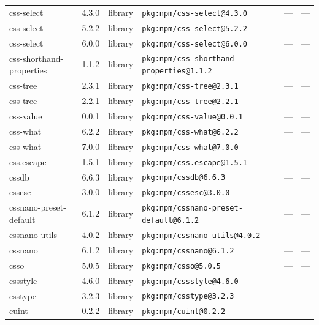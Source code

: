 \documentclass[11pt,a4paper]{article}
\begin{document}
\begin{longtable}{|p{4cm}|p{2cm}|p{1.6cm}|p{5cm}|p{1.5cm}|p{3.5cm}|}
\raggedright css-select & 4.3.0 & library & \small\texttt{pkg:npm/css-select@4.3.0} & — & \small — \\
\raggedright css-select & 5.2.2 & library & \small\texttt{pkg:npm/css-select@5.2.2} & — & \small — \\
\raggedright css-select & 6.0.0 & library & \small\texttt{pkg:npm/css-select@6.0.0} & — & \small — \\
\raggedright css-shorthand-properties & 1.1.2 & library & \small\texttt{pkg:npm/css-shorthand-properties@1.1.2} & — & \small — \\
\raggedright css-tree & 2.3.1 & library & \small\texttt{pkg:npm/css-tree@2.3.1} & — & \small — \\
\raggedright css-tree & 2.2.1 & library & \small\texttt{pkg:npm/css-tree@2.2.1} & — & \small — \\
\raggedright css-value & 0.0.1 & library & \small\texttt{pkg:npm/css-value@0.0.1} & — & \small — \\
\raggedright css-what & 6.2.2 & library & \small\texttt{pkg:npm/css-what@6.2.2} & — & \small — \\
\raggedright css-what & 7.0.0 & library & \small\texttt{pkg:npm/css-what@7.0.0} & — & \small — \\
\raggedright css.escape & 1.5.1 & library & \small\texttt{pkg:npm/css.escape@1.5.1} & — & \small — \\
\raggedright cssdb & 6.6.3 & library & \small\texttt{pkg:npm/cssdb@6.6.3} & — & \small — \\
\raggedright cssesc & 3.0.0 & library & \small\texttt{pkg:npm/cssesc@3.0.0} & — & \small — \\
\raggedright cssnano-preset-default & 6.1.2 & library & \small\texttt{pkg:npm/cssnano-preset-default@6.1.2} & — & \small — \\
\raggedright cssnano-utils & 4.0.2 & library & \small\texttt{pkg:npm/cssnano-utils@4.0.2} & — & \small — \\
\raggedright cssnano & 6.1.2 & library & \small\texttt{pkg:npm/cssnano@6.1.2} & — & \small — \\
\raggedright csso & 5.0.5 & library & \small\texttt{pkg:npm/csso@5.0.5} & — & \small — \\
\raggedright cssstyle & 4.6.0 & library & \small\texttt{pkg:npm/cssstyle@4.6.0} & — & \small — \\
\raggedright csstype & 3.2.3 & library & \small\texttt{pkg:npm/csstype@3.2.3} & — & \small — \\
\raggedright cuint & 0.2.2 & library & \small\texttt{pkg:npm/cuint@0.2.2} & — & \small — \\

\end{longtable}
\end{document}
